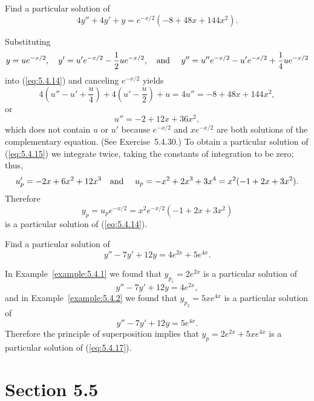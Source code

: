 \setcounter{example}{5}
\setcounter{equation}{13}
\begin{example}
  \label{example:5.4.6} \rm Find a particular solution of
  \begin{equation}
    \label{eq:5.4.14}4y''+4y'+y=e^{-x/2}(-8+48x+144x^{2}).
  \end{equation}
\end{example}
\setcounter{equation}{14}
\begin{examplesolution}
\solution Substituting
\[
  y=ue^{-x/2},\quad y'=u'e^{-x/2}-\frac{1}{2}ue^{-x/2},\mbox{\quad and \quad}y''=u''e^{-x/2}-u'e^{-x/2}+\frac{1}{4}ue^{-x/2}
\]
into (\ref{eq:5.4.14}) and canceling $e^{-x/2}$ yields
\[
  4\left(u''-u'+\frac{u}{4}\right)+4\left(u'-\frac{u}{2}\right)+u=4u''=-8+48x+144x^{2},
\]
or
\begin{equation}
  \label{eq:5.4.15}u''=-2+12x+36x^{2},
\end{equation}
which does not contain $u$ or $u'$ because $e^{-x/2}$ and $xe^{-x/2}$ are both solutions of the
complementary equation. (See Exercise~5.4.30.) To obtain a particular solution of
(\ref{eq:5.4.15}) we integrate twice, taking the constants of integration to be zero; thus,
\[
  u_{p}'=-2x+6x^{2}+12x^{3}\mbox{\quad and \quad}u_{p}=-x^{2}+2x^{3}+3x^{4}=x^{2}(-1+2x+3x^{2}).
\]
Therefore
\[
  y_{p}=u_{p}e^{-x/2}=x^{2}e^{-x/2}(-1+2x+3x^{2})
\]
is a particular solution of (\ref{eq:5.4.14}).
\end{examplesolution}

\setcounter{example}{6}
\setcounter{equation}{16}
\begin{example}
  \label{example:5.4.7} \rm Find a particular solution of
  \begin{equation}
    \label{eq:5.4.17}y''-7y'+12y=4e^{2x}+5e^{4x}.
  \end{equation}
\end{example}
\begin{examplesolution}
\solution In Example~\ref{example:5.4.1} we found that $y_{p_{1}}=2e^{2x}$ is a particular solution
of
\[
  y''-7y'+12y=4e^{2x},
\]
and in Example~\ref{example:5.4.2} we found that $y_{p_{2}}=5xe^{4x}$ is a particular solution of
\[
  y''-7y'+12y=5e^{4x}.
\]
Therefore the principle of superposition implies that $y_{p}=2e^{2x}+5xe^{4x}$ is a particular
solution of (\ref{eq:5.4.17}).
\end{examplesolution}

\section*{Section 5.5}
\setcounter{chapter}{5}
\setcounter{section}{5}


